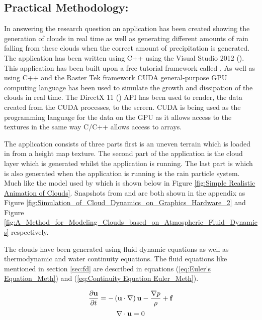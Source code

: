 \subsection{Practical Methodology:}
In answering the research question an application has been created showing the generation of clouds in real time as well as generating different amounts of rain falling from these clouds when the correct amount of precipitation is generated.
The application has been written using C++ using the Visual Studio 2012 (\citeyear{visualstudio2013}).
This application has been built upon a free tutorial framework called \cite{Rastertek14},
As well as using C++ and the Raster Tek framework \cite{nvidia2013} CUDA general-purpose GPU computing language has been used to simulate the growth and dissipation of the clouds in real time.
The DirectX 11 (\citeyear{DirectX12}) API has been used to render, the data created from the CUDA processes, to the screen.
CUDA is being used as the programming language for the data on the GPU as it allows access to the textures in the same way C/C++ allows access to arrays.

The application consists of three parts first is an uneven terrain which is loaded in from a height map texture. The second part of the application is the cloud layer which is generated whilst the application is running. The last part is which is also generated when the application is running is the rain particle system. 
Much like the model used by \citet{DobashiEtAl00} which is shown below in Figure \ref{fig:Simple Realistic Animation of Clouds}. Snapshots from \citet{HarrisEtAl03} and \citet{Miyazaki01} are both shown in the appendix as Figure \ref{fig:Simulation_of_Cloud_Dynamics_on_Graphics_Hardware_2} and Figure \ref{fig:A_Method_for_Modeling_Clouds_based_on_Atmospheric_Fluid_Dynamics} respectively.

The clouds have been generated using fluid dynamic equations as well as thermodynamic and water continuity equations. The fluid equations like mentioned in section \ref{sec:fd} are described in equations (\ref{eq:Euler's Equation_Meth}) and (\ref{eq:Continuity Equation Euler_Meth}). 

\begin{equation} \label{eq:Euler's Equation_Meth}
  \centering
   \frac{\partial \mathbf{u}}{\partial t}=-\left(\mathbf{u}\cdot \nabla \right)\mathbf{u}-\frac{\nabla p}{\rho}+\mathbf{f}
\end{equation}
\begin{equation} \label{eq:Continuity Equation Euler_Meth}
  \centering
  \nabla\cdot\mathbf{u}=0
\end{equation}

